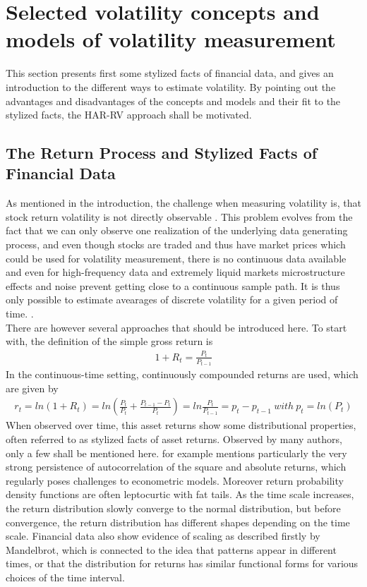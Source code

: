 
\section{Selected volatility concepts and models of volatility measurement}\label{sec:2Models}
This section presents first some stylized facts of financial data, and gives an introduction to the different ways to estimate volatility. By pointing out the advantages and disadvantages of the concepts and models and their fit to the stylized facts, the HAR-RV approach shall be motivated. 


\subsection{The Return Process and Stylized Facts of Financial Data}\label{sec:21ReturnProcess}
As mentioned in the introduction, the challenge when measuring volatility is, that stock return volatility is not directly observable \parencite{tsay2005}. This problem evolves from the fact that we can only observe one realization of the underlying data generating process, and even though stocks are traded and thus have market prices which could be used for volatility measurement, there is no continuous data available and even for high-frequency data and extremely liquid markets microstructure effects and noise prevent getting close to a continuous sample path. It is thus only possible to estimate avearages of discrete volatility for a given period of time. \parencite{andersen2001}.\\
There are however several approaches that should be introduced here. To start with, the definition of the simple gross return is
\begin{align}\label{eq:return}
1+ R_{t} = \frac{P_{t}}{P_{t-1}} 
\end{align}
In the continuous-time setting, continuously compounded returns are used, which are given by
\begin{align}\label{eq:log-return}
r_{t} = ln(1 + R_{t}) = ln (\frac{P_{t}}{P_{t}} + \frac{P_{t-1} - P_{t}}{P_{t}}) = 
ln \frac{P_{t}}{P_{t-1}} = p_{t} - p_{t-1} \ 
with\  p_{t} = ln(P_{t})
\end{align}
When observed over time, this asset returns show some distributional properties, often referred to as stylized facts of asset returns. Observed by many authors, only a few shall be mentioned here. \citeauthor{corsi2009} for example mentions particularly the very strong persistence of autocorrelation of the square and absolute returns, which regularly poses challenges to econometric models. Moreover return probability density functions are often leptocurtic with fat tails. As the time scale increases, the return distribution slowly converge to the normal distribution, but before convergence, the return distribution has different shapes depending on the time scale. Financial data also show evidence of scaling as described firstly by Mandelbrot, which is connected to the idea that patterns appear in different times, or that the distribution for returns has similar functional forms for various choices of the time interval. \\
